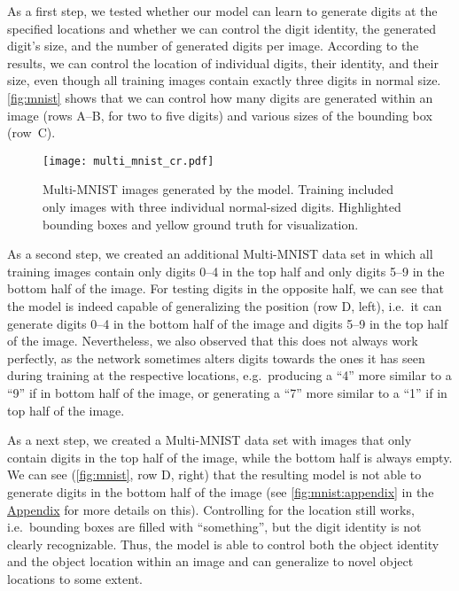 \documentclass{article} \usepackage{iclr2019_conference,times}
\begin{document}
	As a first step, we tested whether our model can learn to generate digits at the specified locations and whether we can control the digit identity, the generated digit's size, and the number of generated digits per image.
	According to the results, we can control the location of individual digits, their identity, and their size, even though all training images contain exactly three digits in normal size. 
	\autoref{fig:mnist} shows that we can control how many digits are generated within an image (rows A--B, for two to five digits) and various sizes of the bounding box (row~C).
\begin{figure}[bt]
		\centering
		\texttt{[image: multi\_mnist\_cr.pdf]}
		\caption{Multi-MNIST images generated by the model. Training included only images with three individual normal-sized digits. Highlighted bounding boxes and yellow ground truth for visualization.}
		\label{fig:mnist}
	\end{figure}
As a second step, we created an additional Multi-MNIST data set in which all training images contain only digits 0--4 in the top half and only digits 5--9 in the bottom half of the image. For testing digits in the opposite half, we can see that the model is indeed capable of generalizing the position (row D, left), i.e.\ it can generate digits 0--4 in the bottom half of the image and digits 5--9 in the top half of the image.
	Nevertheless, we also observed that this does not always work perfectly, as the network sometimes alters digits towards the ones it has seen during training at the respective locations, e.g.\ producing a ``4'' more similar to a ``9'' if in bottom half of the image, or generating a ``7'' more similar to a ``1'' if in top half of the image.
	
	As a next step, we created a Multi-MNIST data set with images that only contain digits in the top half of the image, while the bottom half is always empty.
	We can see (\autoref{fig:mnist}, row D, right) that the resulting model is not able to generate digits in the bottom half of the image (see \autoref{fig:mnist:appendix} in the \hyperref[app:fig:mnist:stackgan]{Appendix} for more details on this).
	Controlling for the location still works, i.e.\ bounding boxes are filled with ``something'', but the digit identity is not clearly recognizable. Thus, the model is able to control both the object identity and the object location within an image and can generalize to novel object locations to some extent.
	
\end{document}
